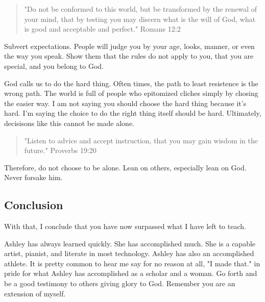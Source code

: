 \documentclass[11pt,a4paper,sans]{article}
\begin{document}
    \begin{quote}
        "Do not be conformed to this world, but be transformed by the renewal of your mind, that by testing you may discern what is the will of God, what is good and acceptable and perfect." Romans 12:2
    \end{quote}

Subvert expectations. People will judge you by your age, looks, manner, or even the way you
speak. Show them that the rules do not apply to you, that you are special, and you belong to 
God.


God calls us to do the hard thing. Often times, the path to least resistence
is the wrong path. The world is full of people who epitomized cliches simply by 
chosing the easier way. I am not saying you should choose the hard thing because it's
hard. I'm saying the choice to do the right thing itself should be hard. Ultimately,
decisisons like this cannot be made alone.

\begin{quote}
    "Listen to advice and accept instruction,
that you may gain wisdom in the future." Proverbs 19:20
\end{quote}

Therefore, do not choose to be alone. Lean on others, especially lean on God. 
Never forsake him.

\subsection{Conclusion}

With that, I conclude that you have now surpassed what I have left to teach. 

Ashley has always learned quickly. She has accomplished much. She is a capable artist,
pianist, and literate in most technology. Ashley has also an accomplished athlete.
It is pretty common to hear me say for no reason at all, "I made that." in pride for 
what Ashley has accomplished as a scholar and a woman. Go forth
and be a good testimony to others giving glory to God. Remember you are an extension 
of myself.
\end{document}
